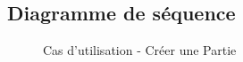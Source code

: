 \documentclass[a4paper,11pt]{article}
\begin{document}
\subsection{Diagramme de séquence}
\begin{figure}[ht!]
\caption{Cas d'utilisation - Créer une Partie}
\end{figure}

\newpage
\end{document}

